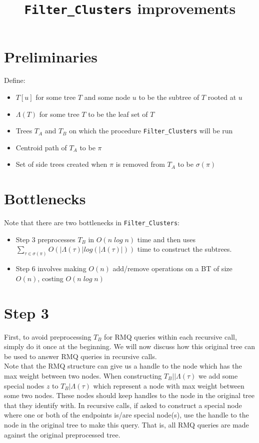 \documentclass[a4paper]{article}
\title{\texttt{Filter\_Clusters} improvements}
\begin{document}
    \maketitle

    \section{Preliminaries}
    Define:
    \begin{itemize}
        \item $T[u]$ for some tree $T$ and some node $u$ to be the subtree of $T$ rooted at $u$
        \item $\Lambda(T)$ for some tree $T$ to be the leaf set of $T$
        \item Trees $T_A$ and $T_B$ on which the procedure \texttt{Filter\_Clusters} will be run
        \item Centroid path of $T_A$ to be $\pi$
        \item Set of side trees created when $\pi$ is removed from $T_A$ to be $\sigma(\pi)$
    \end{itemize}

    \section{Bottlenecks}

    Note that there are two bottlenecks in \texttt{Filter\_Clusters}:
    \begin{itemize}
        \item Step 3 preprocesses $T_B$ in $O(n\;log\;n)$ time and then uses $\sum_{\tau\in\sigma(\pi)}O(|\Lambda(\tau)|log(|\Lambda(\tau)|))$ time to construct the subtrees.

        \item Step 6 involves making $O(n)$ add/remove operations on a BT of size $O(n)$, costing $O(n\;log\;n)$
    \end{itemize}

    \section{Step 3}

    First, to avoid preprocessing $T_B$ for RMQ queries within each recursive call, simply do it once at the beginning. We will now discuss how this original tree can be used to answer RMQ queries in recursive calls.\\

    Note that the RMQ structure can give us a handle to the node which has the max weight between two nodes. When constructing $T_B||\Lambda(\tau)$ we add some special nodes $z$ to $T_B|\Lambda(\tau)$ which represent a node with max weight between some two nodes. These nodes should keep handles to the node in the original tree that they identify with. In recursive calls, if asked to construct a special node where one or both of the endpoints is/are special node(s), use the handle to the node in the original tree to make this query. That is, all RMQ queries are made against the original preprocessed tree.\\
\end{document}
